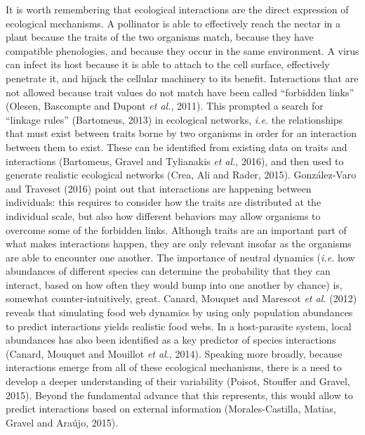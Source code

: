 \documentclass[12pt]{article}
\begin{document}
It is worth remembering that ecological interactions are the direct
expression of ecological mechanisms. A pollinator is able to effectively
reach the nectar in a plant because the traits of the two organisms
match, because they have compatible phenologies, and because they occur
in the same environment. A virus can infect its host because it is able
to attach to the cell surface, effectively penetrate it, and hijack the
cellular machinery to its benefit. Interactions that are not allowed
because trait values do not match have been called \enquote{forbidden
links} (Olesen, Bascompte and Dupont \emph{et al.}, 2011). This prompted
a search for \enquote{linkage rules} (Bartomeus, 2013) in ecological
networks, \emph{i.e.} the relationships that must exist between traits
borne by two organisms in order for an interaction between them to
exist. These can be identified from existing data on traits and
interactions (Bartomeus, Gravel and Tylianakis \emph{et al.}, 2016), and
then used to generate realistic ecological networks (Crea, Ali and
Rader, 2015). González-Varo and Traveset (2016) point out that
interactions are happening between individuals: this requires to
consider how the traits are distributed at the individual scale, but
also how different behaviors may allow organisms to overcome some of the
forbidden links. Although traits are an important part of what makes
interactions happen, they are only relevant insofar as the organisms are
able to encounter one another. The importance of neutral dynamics
(\emph{i.e.} how abundances of different species can determine the
probability that they can interact, based on how often they would bump
into one another by chance) is, somewhat counter-intuitively, great.
Canard, Mouquet and Marescot \emph{et al.} (2012) reveals that
simulating food web dynamics by using only population abundances to
predict interactions yields realistic food webs. In a host-parasite
system, local abundances has also been identified as a key predictor of
species interactions (Canard, Mouquet and Mouillot \emph{et al.}, 2014).
Speaking more broadly, because interactions emerge from all of these
ecological mechanisms, there is a need to develop a deeper understanding
of their variability (Poisot, Stouffer and Gravel, 2015). Beyond the
fundamental advance that this represents, this would allow to predict
interactions based on external information (Morales-Castilla, Matias,
Gravel and Araújo, 2015).
\end{document}
